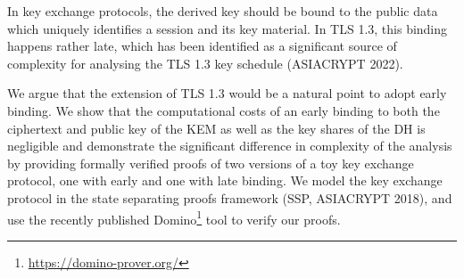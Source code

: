In key exchange protocols, the derived key should be bound to the public data which uniquely identifies a session and its key material. In TLS 1.3, this binding happens rather late, which has been identified as a significant source of complexity for analysing the TLS 1.3 key schedule (ASIACRYPT 2022).

We argue that the extension of TLS 1.3 would be a natural point to adopt early binding. We show that the computational costs of an early binding to both the ciphertext and public key of the KEM as well as the key shares of the DH is negligible and demonstrate the significant difference in complexity of the analysis by providing formally verified proofs of two versions of a toy key exchange protocol, one with early and one with late binding. We model the key exchange protocol in the state separating proofs framework (SSP, ASIACRYPT 2018), and use the recently published Domino\footnote{\url{https://domino-prover.org/}} tool to verify our proofs.
